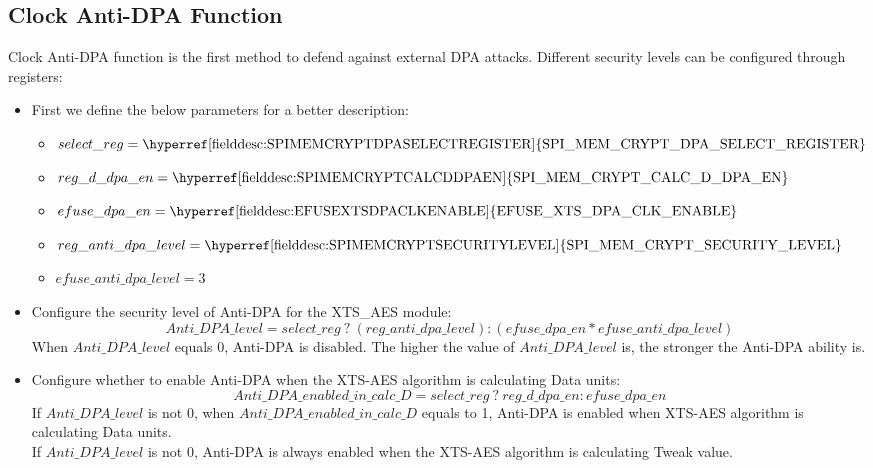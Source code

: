 \documentclass[main\_\_EN.tex]{subfiles}
\begin{document}
\subsection{Clock Anti-DPA Function}
Clock Anti-DPA function is the first method to defend against external DPA attacks. Different security levels can be configured through registers:
\begin{itemize}
    \item First we define the below parameters for a better description:
    \begin{itemize}
        \item $select\_reg     = \textrm{\hyperref[fielddesc:SPIMEMCRYPTDPASELECTREGISTER]{SPI\_MEM\_CRYPT\_DPA\_SELECT\_REGISTER}}$
        \item $reg\_d\_dpa\_en = \textrm{\hyperref[fielddesc:SPIMEMCRYPTCALCDDPAEN]{SPI\_MEM\_CRYPT\_CALC\_D\_DPA\_EN}}$
        \item $efuse\_dpa\_en  = \textrm{\hyperref[fielddesc:EFUSEXTSDPACLKENABLE]{EFUSE\_XTS\_DPA\_CLK\_ENABLE}}$
        \item $reg\_anti\_dpa\_level = \textrm{\hyperref[fielddesc:SPIMEMCRYPTSECURITYLEVEL]{SPI\_MEM\_CRYPT\_SECURITY\_LEVEL}}$
        \item $efuse\_anti\_dpa\_level = \textrm{3}$
    \end{itemize}
    \item Configure the security level of Anti-DPA for the XTS\_AES module:
    $$ Anti\_DPA\_level = select\_reg \ ?\  (reg\_anti\_dpa\_level) : (efuse\_dpa\_en * efuse\_anti\_dpa\_level) $$
    When $Anti\_DPA\_level$ equals 0, Anti-DPA is disabled. The higher the value of $Anti\_DPA\_level$ is, the stronger the Anti-DPA ability is.
    \item Configure whether to enable Anti-DPA when the XTS-AES algorithm is calculating Data units:
    $$ Anti\_DPA\_enabled\_in\_calc\_D = select\_reg \ ? \ reg\_d\_dpa\_en : efuse\_dpa\_en $$
    If $Anti\_DPA\_level$ is not 0, when $ Anti\_DPA\_enabled\_in\_calc\_D $ equals to 1, Anti-DPA is enabled when XTS-AES algorithm is calculating Data units.\\
    If $Anti\_DPA\_level$ is not 0, Anti-DPA is always enabled when the XTS-AES algorithm is calculating Tweak value.
\end{itemize}
\end{document}
